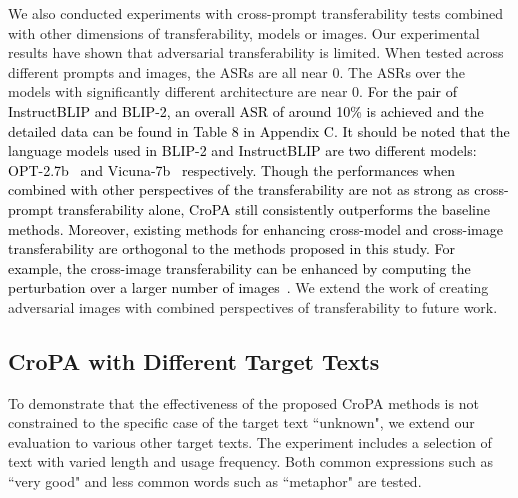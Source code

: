  We also conducted experiments with cross-prompt transferability tests combined with other dimensions of transferability, models or images.  Our experimental results have shown that adversarial transferability is limited. When tested across different prompts and images, the ASRs are all near 0.   The ASRs over the models with significantly different architecture are near 0. \textcolor{black}{For the pair of InstructBLIP and BLIP-2, an overall ASR of around 10\% is achieved and the detailed data can be found in Table 8 in Appendix C. It should be noted that the language models used in  BLIP-2 and InstructBLIP are two different models: OPT-2.7b~\citep{zhang2022opt} and Vicuna-7b~\citep{zheng2023judging-vicuna} respectively. Though the performances when combined with other perspectives of the transferability are not as strong as cross-prompt transferability alone, CroPA still consistently outperforms the baseline methods. Moreover, existing methods for enhancing cross-model and cross-image transferability are orthogonal to the methods proposed in this study. For example, the cross-image transferability can be enhanced by computing the perturbation over a larger number of images~\citep{moosavi2017universal}. } We extend the work of creating adversarial images with combined perspectives of transferability to future work. 

\subsection{CroPA with Different Target Texts}
To demonstrate that the effectiveness of the proposed CroPA methods is not constrained to the specific case of the target text ``unknown", we extend our evaluation to various other target texts. The experiment includes a selection of text with varied length and usage frequency. Both common expressions such as ``very good" and less common words such as ``metaphor" are tested. 

